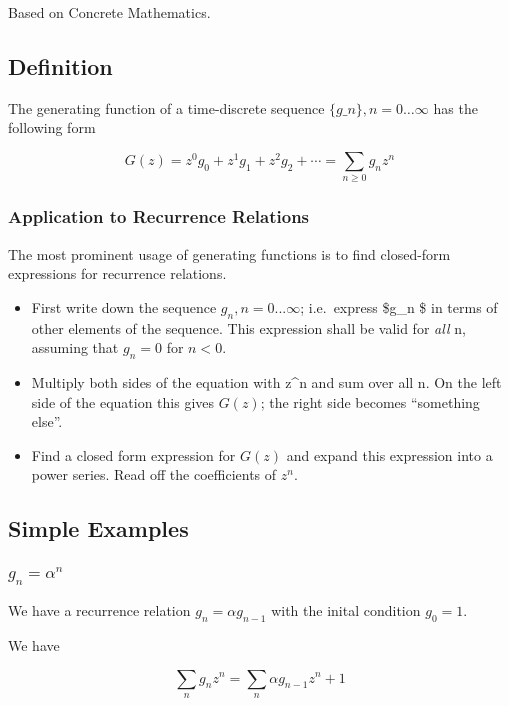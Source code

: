 

Based on Concrete Mathematics.

\subsection{Definition}\label{definition}

The generating function of a time-discrete sequence $\{g\_n\}, n=0\ldots{}\infty$ has the following form

\[ G(z) = z^0 g_0 + z^1 g_1 + z^2 g_2 + \cdots = \sum_{n \geq 0} g_n z^n\]

\subsubsection{Application to Recurrence Relations}

The most prominent usage of generating functions is to find closed-form expressions for recurrence relations.

\begin{itemize}
\item
  First write down the sequence \({g_n}, n=0...\infty\); i.e.~express
  \$g\_n \$ in terms of other elements of the sequence. This expression
  shall be valid for \emph{all} n, assuming that \(g_n=0\) for
  \(n < 0\).
\item
  Multiply both sides of the equation with z\^{}n and sum over all n. On
  the left side of the equation this gives \(G(z)\); the right side
  becomes ``something else''.
\item
  Find a closed form expression for \(G(z)\) and expand this expression
  into a power series. Read off the coefficients of \(z^n\).
\end{itemize}

\subsection{Simple Examples}

\subsubsection{\texorpdfstring{\(g_n=\alpha^n\)}{g\_n=\textbackslash{}alpha\^{}n}}

We have a recurrence relation \(g_n=\alpha g_{n-1}\) with the inital
condition \(g_0=1\).

We have

\[\sum_n g_n z^n = \sum_n \alpha g_{n-1} z^n + 1\]

